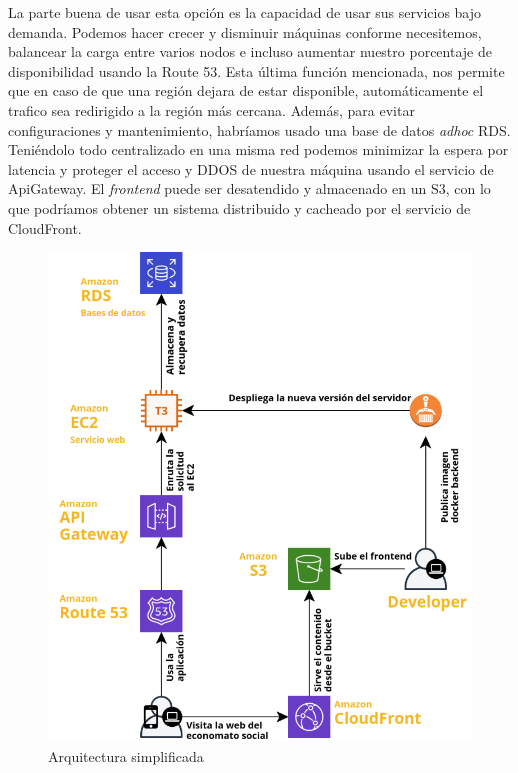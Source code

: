 \par La parte buena de usar esta opción es la capacidad de usar sus servicios bajo demanda. Podemos hacer crecer y disminuir máquinas conforme necesitemos, balancear la carga entre varios nodos e incluso aumentar nuestro porcentaje de disponibilidad usando la Route 53. Esta última función mencionada, nos permite que en caso de que una región dejara de estar disponible, automáticamente el trafico sea redirigido a la región más cercana. Además, para evitar configuraciones y mantenimiento, habríamos usado una base de datos \emph{adhoc} RDS. Teniéndolo todo centralizado en una misma red podemos minimizar la espera por latencia y proteger el acceso y DDOS de nuestra máquina usando el servicio de ApiGateway. El \emph{frontend} puede ser desatendido y almacenado en un S3, con lo que podríamos obtener un sistema distribuido y cacheado por el servicio de CloudFront.
\begin{figure}[h]
\centering
\includegraphics[scale=0.5]{archivos/arquitecturaAws.png}
\caption{Arquitectura simplificada}
\end{figure}

